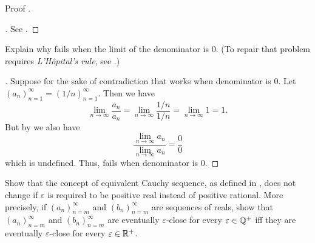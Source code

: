 \begin{ex}\label{i:ex:6.1.8}
  Proof .
\end{ex}

\begin{proof}[]
  See .
\end{proof}

\begin{ex}\label{i:ex:6.1.9}
  Explain why  fails when the limit of the denominator is \(0\).
  (To repair that problem requires \emph{L'Hôpital's rule}, see .)
\end{ex}

\begin{proof}[]
  Suppose for the sake of contradiction that  works when denominator is \(0\).
  Let \((a_n)_{n = 1}^\infty = (1 / n)_{n = 1}^\infty\).
  Then we have
  \[
    \lim_{n \to \infty} \dfrac{a_n}{a_n} = \lim_{n \to \infty} \dfrac{1 / n}{1 / n} = \lim_{n \to \infty} 1 = 1.
  \]
  But by  we also have
  \[
    \dfrac{\lim_{n \to \infty} a_n}{\lim_{n \to \infty} a_n} = \dfrac{0}{0}
  \]
  which is undefined.
  Thus,  fails when denominator is \(0\).
\end{proof}

\begin{ex}\label{i:ex:6.1.10}
  Show that the concept of equivalent Cauchy sequence, as defined in , does not change if \(\varepsilon\) is required to be positive real instead of positive rational.
  More precisely, if \((a_n)_{n = m}^\infty\) and \((b_n)_{n = m}^\infty\) are sequences of reals, show that \((a_n)_{n = m}^\infty\) and \((b_n)_{n = m}^\infty\) are eventually \(\varepsilon\)-close for every \(\varepsilon \in \mathbb{Q}^+\) iff they are eventually \(\varepsilon\)-close for every \(\varepsilon \in \mathbb{R}^+\).
\end{ex}

